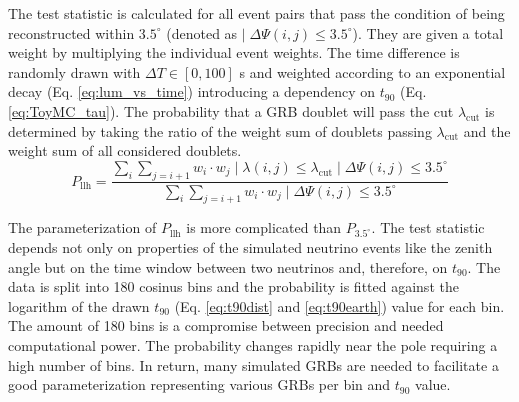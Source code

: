 The test statistic is calculated for all event pairs that pass the condition of
being reconstructed within $3.5^\circ$ (denoted as $| \; \Delta \Psi(i, j) \leq 
3.5^{\circ}$). They are given a total weight by multiplying the individual 
event weights.
The time difference is randomly drawn
with $\Delta T \in [0, 100]$ s and weighted according to an exponential decay
(Eq. \ref{eq:lum_vs_time}) introducing a dependency on $t_{90}$
(Eq. \ref{eq:ToyMC_tau}).
The probability that
a GRB doublet will pass the cut $\lambda_\text{cut}$ is determined by taking 
the ratio of the weight sum of doublets passing $\lambda_\text{cut}$ and the 
weight sum of all considered doublets.
\begin{equation}
\label{eq:Pllh}
 P_\text{llh} = \frac{\sum_{i} \sum_{j=i+1} w_i \cdot w_j \; | \; \lambda(i, j)
\leq \lambda_\text{cut} \; | \; \Delta \Psi(i, j) \leq 3.5^{\circ}}{\sum_i
\sum_{j=i+1} w_i \cdot w_j \; | \; \Delta \Psi(i, j) \leq 3.5^{\circ}}
\end{equation}




The parameterization of $P_\text{llh}$ is more complicated than
$P_{3.5^\circ}$. The test statistic depends not only on properties of the 
simulated neutrino events like the zenith angle
but on the time window 
between two neutrinos and, therefore, on $t_{90}$. The data is split 
into 180 cosinus bins
and the probability is fitted against the logarithm of the drawn $t_{90}$ (Eq.
\ref{eq:t90dist} and \ref{eq:t90earth}) value for each bin. The amount of 180 
bins is a compromise between precision and needed computational power. The 
probability changes rapidly near the pole requiring a high 
number of bins. In return, many simulated GRBs are needed to facilitate a good 
parameterization representing various GRBs per bin and $t_{90}$ value.

